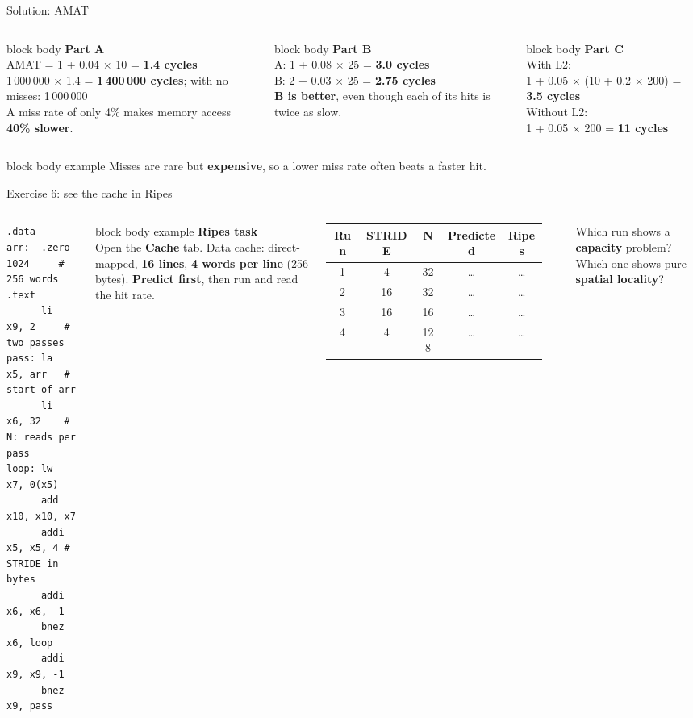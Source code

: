 \documentclass[aspectratio=169,10pt]{beamer}
\newcommand{\stepbox}[2]{%
  \begin{beamercolorbox}[rounded=true,sep=0.09cm,wd=\linewidth]{block body}
    \footnotesize\textbf{#1}\\ #2
  \end{beamercolorbox}\vspace{0.06cm}}
\newcommand{\taskhead}[2]{%
  \begin{beamercolorbox}[rounded=true,sep=0.12cm,wd=\linewidth]{block body example}
    \small\textbf{#1}\\[0.04cm]
    \footnotesize #2
  \end{beamercolorbox}\vspace{0.1cm}}
\newcommand{\keymsg}[1]{%
  \begin{beamercolorbox}[rounded=true,sep=0.1cm,wd=\textwidth]{block body example}
    \centering\footnotesize #1
  \end{beamercolorbox}}
\begin{document}
\begin{frame}{Solution: AMAT}
  \begin{columns}[T,onlytextwidth]
      \stepbox{Part A}{AMAT = 1 + 0.04 $\times$ 10 = \textbf{1.4 cycles}\\[0.1cm]
        1\,000\,000 $\times$ 1.4 = \textbf{1\,400\,000 cycles}; with no misses: 1\,000\,000\\[0.1cm]
        A miss rate of only 4\% makes memory access \textbf{40\% slower}.}
      \stepbox{Part B}{A: 1 + 0.08 $\times$ 25 = \textbf{3.0 cycles}\\[0.1cm]
        B: 2 + 0.03 $\times$ 25 = \textbf{2.75 cycles}\\[0.1cm]
        \textbf{B is better}, even though each of its hits is twice as slow.}
      \stepbox{Part C}{With L2:\\ 1 + 0.05 $\times$ (10 + 0.2 $\times$ 200) = \textbf{3.5 cycles}\\[0.1cm]
        Without L2:\\ 1 + 0.05 $\times$ 200 = \textbf{11 cycles}}
  \end{columns}
  \vfill
  \keymsg{Misses are rare but \textbf{expensive}, so a lower miss rate often beats a faster hit.}
\end{frame}

\begin{frame}[fragile]{Exercise 6: see the cache in Ripes}
  \begin{columns}[T,onlytextwidth]
\begin{lstlisting}[style=rv]
.data
arr:  .zero 1024     # 256 words
.text
      li   x9, 2     # two passes
pass: la   x5, arr   # start of arr
      li   x6, 32    # N: reads per pass
loop: lw   x7, 0(x5)
      add  x10, x10, x7
      addi x5, x5, 4 # STRIDE in bytes
      addi x6, x6, -1
      bnez x6, loop
      addi x9, x9, -1
      bnez x9, pass
\end{lstlisting}
      \taskhead{Ripes task}{Open the \textbf{Cache} tab. Data cache: direct-mapped, \textbf{16 lines},
        \textbf{4 words per line} (256 bytes). \textbf{Predict first}, then run and read the hit rate.}
      \centering\scriptsize
      \renewcommand{\arraystretch}{1.2}
      \begin{tabular}{ccccc}
        \toprule
        Run & STRIDE & N & Predicted & Ripes \\
        \midrule
        1 & 4  & 32  & \ldots & \ldots \\
        2 & 16 & 32  & \ldots & \ldots \\
        3 & 16 & 16  & \ldots & \ldots \\
        4 & 4  & 128 & \ldots & \ldots \\
        \bottomrule
      \end{tabular}\\[0.15cm]
      \raggedright
      Which run shows a \textbf{capacity} problem? Which one shows pure \textbf{spatial locality}?
  \end{columns}
\end{frame}
\end{document}
